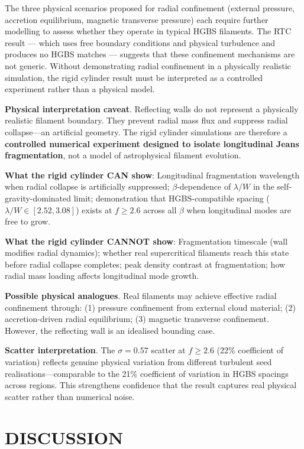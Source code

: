 \documentclass[twocolumn]{mnras}
\begin{document}
The three physical scenarios proposed for radial confinement (external pressure, accretion equilibrium, magnetic transverse pressure) each require further modelling to assess whether they operate in typical HGBS filaments. The RTC result --- which uses free boundary conditions and physical turbulence and produces no HGBS matches --- suggests that these confinement mechanisms are not generic. Without demonstrating radial confinement in a physically realistic simulation, the rigid cylinder result must be interpreted as a controlled experiment rather than a physical model.

\textbf{Physical interpretation caveat}. Reflecting walls do not represent a physically realistic filament boundary. They prevent radial mass flux and suppress radial collapse---an artificial geometry. The rigid cylinder simulations are therefore a \textbf{controlled numerical experiment designed to isolate longitudinal Jeans fragmentation}, not a model of astrophysical filament evolution.

\textbf{What the rigid cylinder CAN show}: Longitudinal fragmentation wavelength when radial collapse is artificially suppressed; $\beta$-dependence of $\lambda/W$ in the self-gravity-dominated limit; demonstration that HGBS-compatible spacing ($\lambda/W \in [2.52, 3.08]$) exists at $f \geq 2.6$ across all $\beta$ when longitudinal modes are free to grow.

\textbf{What the rigid cylinder CANNOT show}: Fragmentation timescale (wall modifies radial dynamics); whether real supercritical filaments reach this state before radial collapse completes; peak density contrast at fragmentation; how radial mass loading affects longitudinal mode growth.

\textbf{Possible physical analogues}. Real filaments may achieve effective radial confinement through: (1) pressure confinement from external cloud material; (2) accretion-driven radial equilibrium; (3) magnetic transverse confinement. However, the reflecting wall is an idealised bounding case.

\textbf{Scatter interpretation}. The $\sigma = 0.57$ scatter at $f \geq 2.6$ (22\% coefficient of variation) reflects genuine physical variation from different turbulent seed realisations—comparable to the 21\% coefficient of variation in HGBS spacings across regions. This strengthens confidence that the result captures real physical scatter rather than numerical noise.

\section{DISCUSSION}
\end{document}
